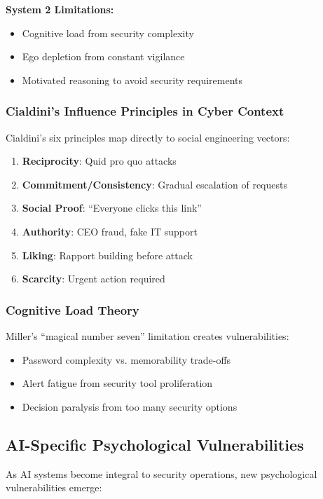\documentclass[11pt,a4paper]{article}
\begin{document}
\textbf{System 2 Limitations:}
\begin{itemize}
\item Cognitive load from security complexity
\item Ego depletion from constant vigilance
\item Motivated reasoning to avoid security requirements
\end{itemize}

\subsubsection{Cialdini's Influence Principles in Cyber Context}

Cialdini's\cite{cialdini2007} six principles map directly to social engineering vectors:
\begin{enumerate}
\item \textbf{Reciprocity}: Quid pro quo attacks
\item \textbf{Commitment/Consistency}: Gradual escalation of requests
\item \textbf{Social Proof}: ``Everyone clicks this link''
\item \textbf{Authority}: CEO fraud, fake IT support
\item \textbf{Liking}: Rapport building before attack
\item \textbf{Scarcity}: Urgent action required
\end{enumerate}

\subsubsection{Cognitive Load Theory}

Miller's\cite{miller1956} ``magical number seven'' limitation creates vulnerabilities:
\begin{itemize}
\item Password complexity vs. memorability trade-offs
\item Alert fatigue from security tool proliferation
\item Decision paralysis from too many security options
\end{itemize}

\subsection{AI-Specific Psychological Vulnerabilities}

As AI systems become integral to security operations, new psychological vulnerabilities emerge:
\end{document}

